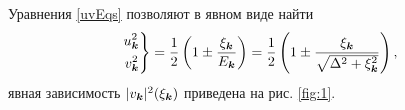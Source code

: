 Уравнения \eqref{uvEqs} позволяют в явном виде найти
\begin{equation*}
	\left.\begin{aligned}
	    u_{{\boldsymbol{k}}}^2 \\
	    v_{{\boldsymbol{k}}}^2
	\end{aligned}\right\}
	= \frac{1}{2} \left(1 \pm \frac{\xi_{{\boldsymbol{k}}}}{E_{{\boldsymbol{k}}}}\right) = \frac{1}{2}\left(
		1 \pm \frac{\xi_{{\boldsymbol{k}}}}{\sqrt{\Delta^2 + \xi_{{\boldsymbol{k}}}^2}}
	\right),
\end{equation*}
явная зависимость $|v_{{\boldsymbol{k}}}|^2(\xi_{{\boldsymbol{k}}})$ приведена на рис. \ref{fig:1}.	





